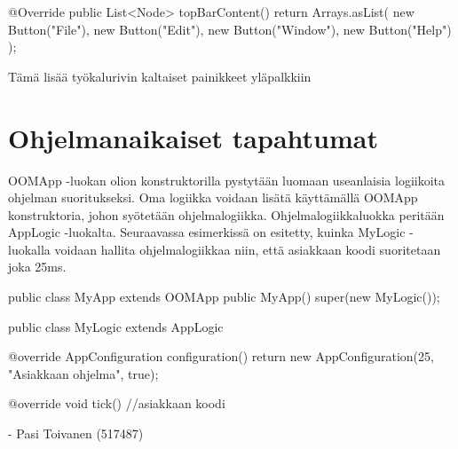 \begin{javacode}
@Override
public List<Node> topBarContent() {
	return Arrays.asList(
		new Button("File"),
		new Button("Edit"),
		new Button("Window"),
		new Button("Help")
	);
}
\end{javacode}

Tämä lisää työkalurivin kaltaiset painikkeet yläpalkkiin

\section{Ohjelmanaikaiset tapahtumat}

\label{D}

OOMApp -luokan olion konstruktorilla pystytään luomaan useanlaisia logiikoita
ohjelman suoritukseksi. Oma logiikka voidaan lisätä käyttämällä OOMApp
konstruktoria, johon syötetään ohjelmalogiikka. Ohjelmalogiikkaluokka peritään
AppLogic -luokalta. Seuraavassa esimerkissä on esitetty, kuinka MyLogic
-luokalla voidaan hallita ohjelmalogiikkaa niin, että asiakkaan koodi
suoritetaan joka 25ms.

\begin{javacode}
public class MyApp extends OOMApp {
	public MyApp() {
		super(new MyLogic());
	}
}

public class MyLogic extends AppLogic {
	@override
	AppConfiguration configuration() {
		return new AppConfiguration(25, "Asiakkaan ohjelma", true);
	}
    
	@override
	void tick() {
		//asiakkaan koodi
	}
}
\end{javacode}

- Pasi Toivanen (517487)
